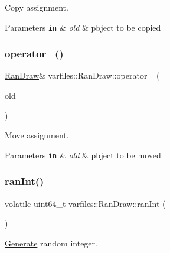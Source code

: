Copy assignment. 


\begin{DoxyParams}[1]{Parameters}
\mbox{\tt in}  & {\em old} & pbject to be copied \\
\hline
\end{DoxyParams}
\mbox{\label{classvarfiles_1_1_ran_draw_a167eaea1db130c17f343a57e240ce91c}} 
\subsubsection{\texorpdfstring{operator=()}{operator=()}\hspace{0.1cm}{\footnotesize\ttfamily [2/2]}}
{\footnotesize\ttfamily \hyperlink{classvarfiles_1_1_ran_draw}{Ran\+Draw}\& varfiles\+::\+Ran\+Draw\+::operator= (\begin{DoxyParamCaption}\item[{\hyperlink{classvarfiles_1_1_ran_draw}{Ran\+Draw} \&\&}]{old }\end{DoxyParamCaption})\hspace{0.3cm}{\ttfamily [default]}}



Move assignment. 


\begin{DoxyParams}[1]{Parameters}
\mbox{\tt in}  & {\em old} & pbject to be moved \\
\hline
\end{DoxyParams}
\mbox{\label{classvarfiles_1_1_ran_draw_a8a6157061c5851d9ac79fbf479b19535}} 
\subsubsection{\texorpdfstring{ran\+Int()}{ranInt()}}
{\footnotesize\ttfamily volatile uint64\+\_\+t varfiles\+::\+Ran\+Draw\+::ran\+Int (\begin{DoxyParamCaption}{ }\end{DoxyParamCaption})\hspace{0.3cm}{\ttfamily [inline]}}



\hyperlink{classvarfiles_1_1_generate}{Generate} random integer. 

